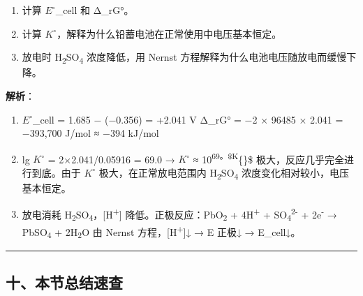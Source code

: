 \documentclass[a4paper,11pt]{ctexart}
\providecommand{\tightlist}{\setlength{\itemsep}{0pt}\setlength{\parskip}{0pt}}
\begin{document}
\begin{enumerate}
\def\labelenumi{(\alph{enumi})}
\tightlist
\item
  计算 \(E^{\circ}\)\_cell 和 Δ\_rG°。
\item
  计算 \(K^{\circ}\)，解释为什么铅蓄电池在正常使用中电压基本恒定。
\item
  放电时 H\textsubscript{2}SO\textsubscript{4} 浓度降低，用 Nernst 方程解释为什么电池电压随放电而缓慢下降。
\end{enumerate}

\textbf{解析}：

\begin{enumerate}
\def\labelenumi{(\alph{enumi})}
\item
  \(E^{\circ}\)\_cell = 1.685 − (−0.356) = +2.041 V
  Δ\_rG° = −2 × 96485 × 2.041 = −393,700 J/mol ≈ −394 kJ/mol
\item
  lg \(K^{\circ}\) = 2×2.041/0.05916 = 69.0 → \(K^{\circ}\) ≈ 10\textsuperscript{69。\$K}\{\circ\}\$ 极大，反应几乎完全进行到底。由于 \(K^{\circ}\) 极大，在正常放电范围内 H\textsubscript{2}SO\textsubscript{4} 浓度变化相对较小，电压基本恒定。
\item
  放电消耗 H\textsubscript{2}SO\textsubscript{4}，{[}H\textsuperscript{+}{]} 降低。正极反应：PbO\textsubscript{2} + 4H\textsuperscript{+} + SO\textsubscript{4}\textsuperscript{2-} + 2e\textsuperscript{-} → PbSO\textsubscript{4} + 2H\textsubscript{2}O
  由 Nernst 方程，{[}H\textsuperscript{+}{]}↓ → E 正极↓ → E\_cell↓。
\end{enumerate}

\begin{center}\rule{0.5\linewidth}{0.5pt}\end{center}

\subsection{十、本节总结速查}\label{ux5341ux672cux8282ux603bux7ed3ux901fux67e5}
\end{document}
